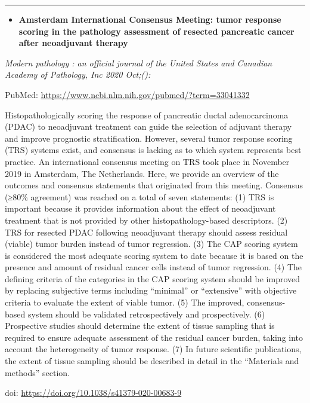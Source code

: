 \documentclass[
]{article}
\providecommand{\tightlist}{%
  \setlength{\itemsep}{0pt}\setlength{\parskip}{0pt}}
\begin{document}
\begin{center}\rule{0.5\linewidth}{0.5pt}\end{center}

\begin{itemize}
\tightlist
\item
  \textbf{Amsterdam International Consensus Meeting: tumor response
  scoring in the pathology assessment of resected pancreatic cancer
  after neoadjuvant therapy}
\end{itemize}

\emph{Modern pathology : an official journal of the United States and
Canadian Academy of Pathology, Inc 2020 Oct;():}

PubMed: \url{https://www.ncbi.nlm.nih.gov/pubmed/?term=33041332}

Histopathologically scoring the response of pancreatic ductal
adenocarcinoma (PDAC) to neoadjuvant treatment can guide the selection
of adjuvant therapy and improve prognostic stratification. However,
several tumor response scoring (TRS) systems exist, and consensus is
lacking as to which system represents best practice. An international
consensus meeting on TRS took place in November 2019 in Amsterdam, The
Netherlands. Here, we provide an overview of the outcomes and consensus
statements that originated from this meeting. Consensus (≥80\%
agreement) was reached on a total of seven statements: (1) TRS is
important because it provides information about the effect of
neoadjuvant treatment that is not provided by other histopathology-based
descriptors. (2) TRS for resected PDAC following neoadjuvant therapy
should assess residual (viable) tumor burden instead of tumor
regression. (3) The CAP scoring system is considered the most adequate
scoring system to date because it is based on the presence and amount of
residual cancer cells instead of tumor regression. (4) The defining
criteria of the categories in the CAP scoring system should be improved
by replacing subjective terms including ``minimal'' or ``extensive''
with objective criteria to evaluate the extent of viable tumor. (5) The
improved, consensus-based system should be validated retrospectively and
prospectively. (6) Prospective studies should determine the extent of
tissue sampling that is required to ensure adequate assessment of the
residual cancer burden, taking into account the heterogeneity of tumor
response. (7) In future scientific publications, the extent of tissue
sampling should be described in detail in the ``Materials and methods''
section.

doi: \url{https://doi.org/10.1038/s41379-020-00683-9}
\end{document}
